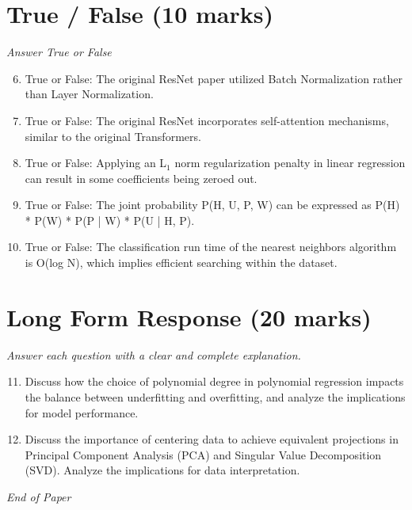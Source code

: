 \documentclass[12pt]{article}
\begin{document}
\section*{True / False (10 marks)}
\textit{Answer True or False}
\begin{enumerate}[label=\arabic*.]
\setcounter{enumi}{5}
\item True or False: The original ResNet paper utilized Batch Normalization rather than Layer Normalization.
\item True or False: The original ResNet incorporates self-attention mechanisms, similar to the original Transformers.
\item True or False: Applying an L$_{1}$ norm regularization penalty in linear regression can result in some coefficients being zeroed out.
\item True or False: The joint probability P(H, U, P, W) can be expressed as P(H) * P(W) * P(P | W) * P(U | H, P).
\item True or False: The classification run time of the nearest neighbors algorithm is O(log N), which implies efficient searching within the dataset.
\end{enumerate}

\section*{Long Form Response (20 marks)}
\textit{Answer each question with a clear and complete explanation.}
\begin{enumerate}[label=\arabic*.]
\setcounter{enumi}{10}
\item Discuss how the choice of polynomial degree in polynomial regression impacts the balance between underfitting and overfitting, and analyze the implications for model performance.
\item Discuss the importance of centering data to achieve equivalent projections in Principal Component Analysis (PCA) and Singular Value Decomposition (SVD). Analyze the implications for data interpretation.
\end{enumerate}

\vfill
\noindent\textit{End of Paper}
\end{document}
